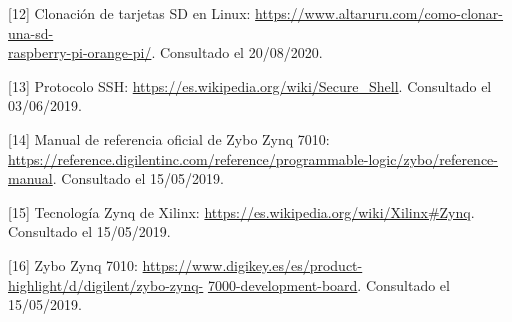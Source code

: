 \hspace{0.5cm}	[\hypertarget{12}{12}] Clonación de tarjetas SD en Linux: \url{https://www.altaruru.com/como-clonar-una-sd-}\\
	\url{raspberry-pi-orange-pi/}. Consultado el 20/08/2020.

\hspace{0.5cm}	[\hypertarget{13}{13}] Protocolo SSH: \url{https://es.wikipedia.org/wiki/Secure_Shell}. Consultado el 03/06/2019.

\hspace{0.5cm}	[\hypertarget{14}{14}] Manual de referencia oficial de Zybo Zynq 7010: \url{https://reference.digilentinc.com/reference/programmable-logic/zybo/reference-manual}. Consultado el 15/05/2019.

\hspace{0.5cm}	[\hypertarget{15}{15}] Tecnología Zynq de Xilinx: \url{https://es.wikipedia.org/wiki/Xilinx#Zynq}. Consultado el 15/05/2019.

\hspace{0.5cm}	[\hypertarget{16}{16}] Zybo Zynq 7010: \url{https://www.digikey.es/es/product-highlight/d/digilent/zybo-zynq-}
\url{7000-development-board}. Consultado el 15/05/2019.


